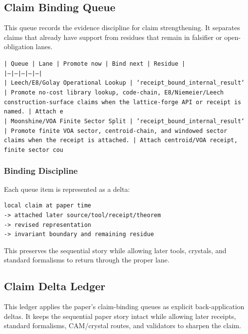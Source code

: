 \documentclass[11pt]{article}
\begin{document}
\subsection*{Claim Binding Queue}

This queue records the evidence discipline for claim strengthening. It separates claims that already have support from residues that remain in falsifier or open-obligation lanes.

\noindent\texttt{| Queue | Lane | Promote now | Bind next | Residue |}\\
\noindent\texttt{|---|---|---|---|---|}\\
\noindent\texttt{| Leech/E8/Golay Operational Lookup | `receipt\_bound\_internal\_result` | Promote no-cost library lookup, code-chain, E8/Niemeier/Leech construction-surface claims when the lattice-forge API or receipt is named. | Attach e}\\
\noindent\texttt{| Moonshine/VOA Finite Sector Split | `receipt\_bound\_internal\_result` | Promote finite VOA sector, centroid-chain, and windowed sector claims when the receipt is attached. | Attach centroid/VOA receipt, finite sector cou}\\

\subsubsection*{Binding Discipline}

Each queue item is represented as a delta:

\begin{verbatim}
local claim at paper time
-> attached later source/tool/receipt/theorem
-> revised representation
-> invariant boundary and remaining residue
\end{verbatim}

This preserves the sequential story while allowing later tools, crystals, and
standard formalisms to return through the proper lane.

\subsection*{Claim Delta Ledger}

This ledger applies the paper's claim-binding queues as explicit back-application
deltas. It keeps the sequential paper story intact while allowing later
receipts, standard formalisms, CAM/crystal routes, and validators to sharpen the
claim.
\end{document}
